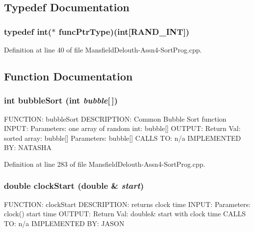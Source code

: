\subsection{Typedef Documentation}
\hypertarget{_mansfield_delouth-_assn4-_sort_prog_8cpp_ae2987d0004dea58df8c833858c0fb370}{
\subsubsection[{funcPtrType}]{\setlength{\rightskip}{0pt plus 5cm}typedef int($\ast$ {\bf funcPtrType})(int\mbox{[}{\bf RAND\_\-INT}\mbox{]})}}
\label{_mansfield_delouth-_assn4-_sort_prog_8cpp_ae2987d0004dea58df8c833858c0fb370}


Definition at line 40 of file MansfieldDelouth-\/Assn4-\/SortProg.cpp.



\subsection{Function Documentation}
\hypertarget{_mansfield_delouth-_assn4-_sort_prog_8cpp_a8bb793ac49cd588089713622d18a8c5b}{
\subsubsection[{bubbleSort}]{\setlength{\rightskip}{0pt plus 5cm}int bubbleSort (int {\em bubble}\mbox{[}$\,$\mbox{]})}}
\label{_mansfield_delouth-_assn4-_sort_prog_8cpp_a8bb793ac49cd588089713622d18a8c5b}
FUNCTION: bubbleSort DESCRIPTION: Common Bubble Sort function INPUT: Parameters: one array of random int: bubble\mbox{[}\mbox{]} OUTPUT: Return Val: sorted array: bubble\mbox{[}\mbox{]} Parameters: bubble\mbox{[}\mbox{]} CALLS TO: n/a IMPLEMENTED BY: NATASHA 

Definition at line 283 of file MansfieldDelouth-\/Assn4-\/SortProg.cpp.

\hypertarget{_mansfield_delouth-_assn4-_sort_prog_8cpp_a97da3b77b5ebacff9297f22e54185c1a}{
\subsubsection[{clockStart}]{\setlength{\rightskip}{0pt plus 5cm}double clockStart (double \& {\em start})}}
\label{_mansfield_delouth-_assn4-_sort_prog_8cpp_a97da3b77b5ebacff9297f22e54185c1a}
FUNCTION: clockStart DESCRIPTION: returns clock time INPUT: Parameters: clock() start time OUTPUT: Return Val: double\& start with clock time CALLS TO: n/a IMPLEMENTED BY: JASON 

